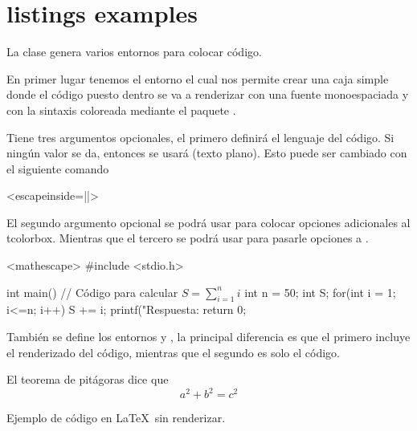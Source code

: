 \documentclass[theme=mocha, pagecolor, pagesize=a5paper, stretchmode=true]{qx-files/qx-notes}
\begin{document}
  \section{listings examples}

  La clase  genera varios entornos para colocar código.

  En primer lugar tenemos el entorno  el cual nos permite crear una caja simple donde el código puesto dentro se va a renderizar con una fuente monoespaciada y con la sintaxis coloreada mediante el paquete .

  Tiene tres argumentos opcionales, el primero definirá el lenguaje del código. Si ningún valor se da, entonces se usará  (texto plano). Esto puede ser cambiado con el siguiente comando
  \begin{texcode}<escapeinside=||>
  \end{texcode}
  El segundo argumento opcional se podrá usar para colocar opciones adicionales al tcolorbox. Mientras que el tercero se podrá usar para pasarle opciones a .

  \begin{texexample}
    \begin{codeblock}[c][colframe=red]<mathescape>
      #include <stdio.h>

      int main() {
        // Código para calcular $ S = \sum_{i=1}^n i$
        int n = 50;
        int S;
        for(int i = 1; i<=n; i++){
          S += i;
        }
        printf("Respuesta: %
        return 0;
      }
    \end{codeblock}
  \end{texexample}

  También se define los entornos  y , la principal diferencia es que el primero incluye el renderizado del código, mientras que el segundo es solo el código.

  \begin{codeblock}
    \begin{texexample}
      El teorema de pitágoras dice que
      \[ a^2 + b^2 = c^2 \]
    \end{texexample}
  \end{codeblock}

  \begin{texexample}
    \begin{texcode}
      Ejemplo de código en \LaTeX\ sin renderizar.
    \end{texcode}
  \end{texexample}
\end{document}

